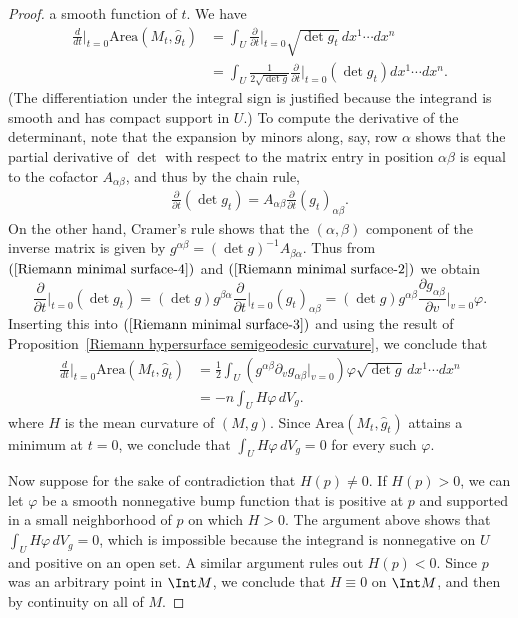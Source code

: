 \begin{proof}
a smooth function of $t$. We have
\begin{equation}\label{Riemann minimal surface-3}
\begin{aligned}
\frac{d}{dt}\Big|_{t=0}\mathrm{Area}(M_t,\hat{g}_t)&=\int_U\frac{\partial}{\partial t}\Big|_{t=0}\sqrt{\det g_t}\,dx^1\cdots dx^n\\
&=\int_U\frac{1}{2\sqrt{\det g}}\frac{\partial}{\partial t}\Big|_{t=0}(\det g_t)dx^1\cdots dx^n.
\end{aligned}
\end{equation}
(The differentiation under the integral sign is justified because the integrand is smooth and has compact support in $U$.)
To compute the derivative of the determinant, note that the expansion by minors along, say, row $\alpha$ shows that the partial derivative of $\det$ with respect to the 
matrix entry in position $\alpha\beta$ is equal to the cofactor $A_{\alpha\beta}$, and thus by the chain rule,
\begin{align}\label{Riemann minimal surface-4}
\frac{\partial}{\partial t}(\det g_t)=A_{\alpha\beta}\frac{\partial}{\partial t}(g_t)_{\alpha\beta}.
\end{align}
On the other hand, Cramer's rule shows that the $(\alpha,\beta)$ component of the inverse matrix is given by $g^{\alpha\beta}=(\det g)^{-1}A_{\beta\alpha}$. Thus from 
$(\ref{Riemann minimal surface-4})$ and $(\ref{Riemann minimal surface-2})$ we obtain
\[\frac{\partial}{\partial t}\Big|_{t=0}(\det g_t)=(\det g)g^{\beta\alpha}\frac{\partial}{\partial t}\Big|_{t=0}(g_t)_{\alpha\beta}=(\det g)g^{\alpha\beta}\frac{\partial g_{\alpha\beta}}{\partial v}\Big|_{v=0}\varphi.\]
Inserting this into $(\ref{Riemann minimal surface-3})$ and using the result of Proposition~\ref{Riemann hypersurface semigeodesic curvature}, we conclude that
\begin{equation}\label{Riemann minimal surface-5}
\begin{aligned}
\frac{d}{dt}\Big|_{t=0}\mathrm{Area}(M_t,\hat{g}_t)&=\frac{1}{2}\int_U(g^{\alpha\beta}\partial_vg_{\alpha\beta}|_{v=0})\varphi\sqrt{\det g}\,dx^1\cdots dx^n\\
&=-n\int_UH\varphi\,dV_g.
\end{aligned}    
\end{equation}
where $H$ is the mean curvature of $(M,g)$. Since $\mathrm{Area}(M_t,\hat{g}_t)$ attains a minimum at $t=0$, we conclude that $\int_UH\varphi\,dV_g=0$ for every 
such $\varphi$.\par
Now suppose for the sake of contradiction that $H(p)\neq 0$. If $H(p)>0$, we can let $\varphi$ be a smooth nonnegative bump function that is positive at $p$ and 
supported in a small neighborhood of $p$ on which $H>0$. The argument above shows that $\int_UH\varphi\,dV_g=0$, which is impossible because the integrand is nonnegative 
on $U$ and positive on an open set. A similar argument rules out $H(p)<0$. Since $p$ was an arbitrary point in $\Int M$, we conclude that $H\equiv 0$ on $\Int M$, and 
then by continuity on all of $M$.
\end{proof}
